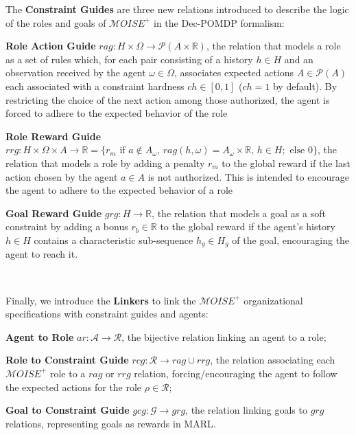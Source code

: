 \documentclass[pdflatex,sn-mathphys-num]{sn-jnl}%
\theoremstyle{thmstyleone}%
\theoremstyle{thmstyletwo}%
\theoremstyle{thmstylethree}%
\begin{document}
\noindent The \textbf{Constraint Guides} are three new relations introduced to describe the logic of the roles and goals of $\mathcal{M}OISE^+$ in the Dec-POMDP formalism:
%
\begin{enumerate*}[label={\roman*) },itemjoin={; \quad}]
    
    \item \textbf{Role Action Guide} \quad $rag: H \times \Omega \rightarrow \mathcal{P}(A \times \mathbb{R})$, the relation that models a role as a set of rules which, for each pair consisting of a history $h \in H$ and an observation received by the agent $\omega \in \Omega$, associates expected actions $A \in \mathcal{P}(A)$ each associated with a constraint hardness $ch \in [0,1]$ ($ch = 1$ by default). By restricting the choice of the next action among those authorized, the agent is forced to adhere to the expected behavior of the role
    \item \textbf{Role Reward Guide} \quad $rrg: H \times \Omega \times A \to \mathbb{R} = \{r_m \text{ if } a \notin A_\omega \text{, } rag(h, \omega) \allowbreak = \allowbreak A_\omega \times \mathbb{R} \text{, } h \in H; \text{ else } 0\}$, the relation that models a role by adding a penalty $r_m$ to the global reward if the last action chosen by the agent $a \in A$ is not authorized. This is intended to encourage the agent to adhere to the expected behavior of a role
    \item \textbf{Goal Reward Guide} \quad $grg: H \rightarrow \mathbb{R}$, the relation that models a goal as a soft constraint by adding a bonus $r_b \in \mathbb{R}$ to the global reward if the agent's history $h \in H$ contains a characteristic sub-sequence $h_g \in H_g$ of the goal, encouraging the agent to reach it.
\end{enumerate*}

\

\noindent Finally, we introduce the \textbf{Linkers} to link the $\mathcal{M}OISE^+$ organizational specifications with constraint guides and agents:
%
\begin{enumerate*}[label={\roman*) },itemjoin={; \quad}]
    
    \item \textbf{Agent to Role} \quad $ar: \mathcal{A} \to \mathcal{R}$, the bijective relation linking an agent to a role;
    \item \textbf{Role to Constraint Guide} \quad $rcg: \mathcal{R} \rightarrow rag \cup rrg$, the relation associating each $\mathcal{M}OISE^+$ role to a $rag$ or $rrg$ relation, forcing/encouraging the agent to follow the expected actions for the role $\rho \in \mathcal{R}$;
    \item \textbf{Goal to Constraint Guide} \quad $gcg: \mathcal{G} \rightarrow grg$, the relation linking goals to $grg$ relations, representing goals as rewards in MARL.
\end{enumerate*}
\end{document}
